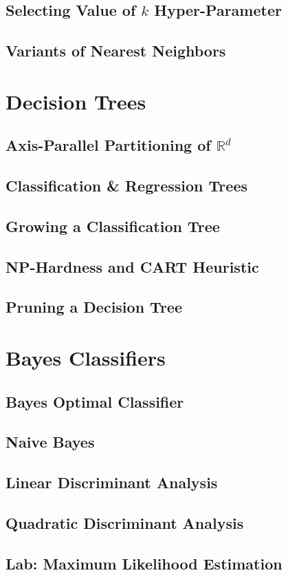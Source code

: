        \subsection{Selecting Value of $k$ Hyper-Parameter}
        \subsection{Variants of Nearest Neighbors}
        
    \section{Decision Trees}
        \subsection{Axis-Parallel Partitioning of $\mathbb{R}^d$}
        \subsection{Classification \& Regression Trees}
        \subsection{Growing a Classification Tree}
        \subsection{NP-Hardness and CART Heuristic}
        \subsection{Pruning a Decision Tree}
    
    \section{Bayes Classifiers}
        \subsection{Bayes Optimal Classifier}
        \subsection{Naive Bayes}
        \subsection{Linear Discriminant Analysis}
        \subsection{Quadratic Discriminant Analysis}
        \subsection{Lab: Maximum Likelihood Estimation}